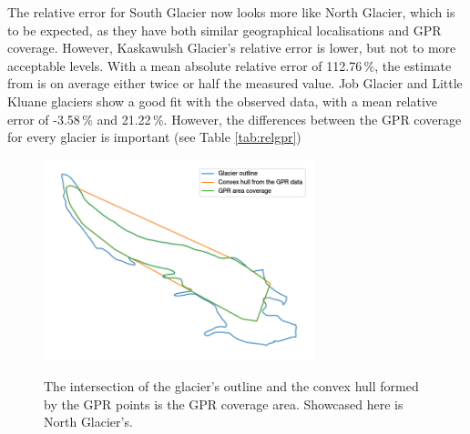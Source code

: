 \documentclass[a4, 12pt]{article}
\begin{document}
The relative error for South Glacier now looks more like North Glacier, which is to be expected, as they have both similar geographical localisations and GPR coverage. However, Kaskawulsh Glacier's relative error is lower, but not to more acceptable levels. With a mean absolute relative error of 112.76\,\%, the estimate from \citet{farinotti2019consensus} is on average either twice or half the measured value. Job Glacier and Little Kluane glaciers show a good fit with the observed data, with a mean relative error of -3.58\,\% and 21.22\,\%. However, the differences between the GPR coverage for every glacier is important (see Table \ref{tab:relgpr})

\begin{table}[h!]
\centering
\small
\caption{Relative GPR coverage for the different glaciers. The relative coverage is the coverage area (Figure \ref{fig:ashape}) divided by the glacier's area from \citet{pfeffer2014randolph}.}
\label{tab:relgpr}
\noindent{}
\end{table}

\begin{figure}
\centering
\includegraphics[width=0.7\textwidth]{../imgs/ashape.png}
\label{fig:ashape}
\caption{The intersection of the glacier's outline and the convex hull formed by the GPR points is the GPR coverage area. Showcased here is North Glacier's.}
\end{figure}
\end{document}
